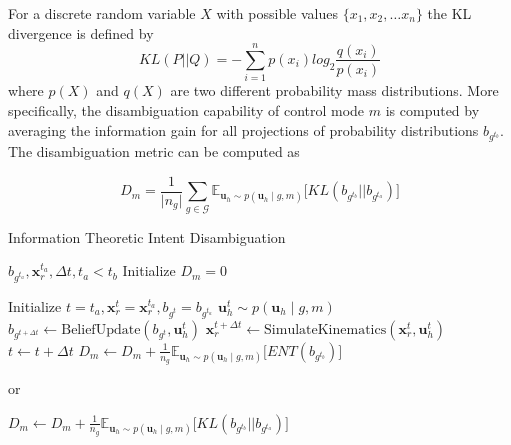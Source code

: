 \documentclass[conference]{IEEEtran}
\begin{document}
For a discrete random variable $X$ with possible values $\{x_1, x_2,\dots x_n\}$ the KL divergence is defined by
\begin{equation*}
KL(P||Q) = -\sum_{i=1}^{n}p(x_i)log_2\frac{q(x_i)}{p(x_i)}
\end{equation*}
where $p(X)$ and $q(X)$ are two different probability mass distributions. 
 More specifically, the disambiguation capability of control mode $m$ is computed by averaging the information gain for all projections of probability distributions $b_{g^{t_b}}$.  The disambiguation metric can be computed as 
 
 \begin{equation}\label{eq:kldiv}
 D_m = \frac{1}{\vert n_g \vert} \sum_{g \in \mathcal{G}}^{} \mathbb{E}_{\boldsymbol{u}_h \sim p(\boldsymbol{u}_h \; | \; g, m)}\Big[KL(b_{g^{t_b}}||b_{g^{t_a}})\Big]
 \end{equation}
% 
\begin{algorithm}[t]
	\caption{Information Theoretic Intent Disambiguation}
	\label{alg:disamb}
	 \begin{algorithmic}[1]
	 	\REQUIRE $b_{g^{t_a}}, \boldsymbol{x}_r^{t_a}, \Delta t, t_a < t_b$
	 	\STATE Initialize $D_m = 0$
	 	
	 	\STATE Initialize $t = t_a, \boldsymbol{x}_r^{t} = \boldsymbol{x}_r^{t_a}, b_{g^{t}} = b_{g^{t_a}}$
	 	\STATE $\boldsymbol{u}_h^t \sim p(\boldsymbol{u}_h\;|\; g, m)$ 
	 	\STATE $b_{g^{t + \Delta t}} \leftarrow \text{BeliefUpdate}(b_{g^{t}}, \boldsymbol{u}_h^t)$
	 	\STATE $\boldsymbol{x}_r^{t + \Delta t}\leftarrow \text{SimulateKinematics}(\boldsymbol{x}_r^{t}, \boldsymbol{u}_h^t)$
	 	\STATE $t \leftarrow t + \Delta t$
	 	\ENDWHILE
	 	\STATE $D_m \leftarrow D_m + \frac{1}{n_g} \mathbb{E}_{\boldsymbol{u}_h \sim p(\boldsymbol{u}_h \; | \; g, m)}\Big[ENT(b_{g^{t_b}})\Big] $
	 	
	 	or
	 	
	 	\STATE $D_m \leftarrow D_m + \frac{1}{n_g} \mathbb{E}_{\boldsymbol{u}_h \sim p(\boldsymbol{u}_h \; | \; g, m)}\Big[KL(b_{g^{t_b}}||b_{g^{t_a}})\Big] $
	 	\ENDFOR
	 	\ENDFOR
	 \end{algorithmic}
\end{algorithm}
\end{document}
